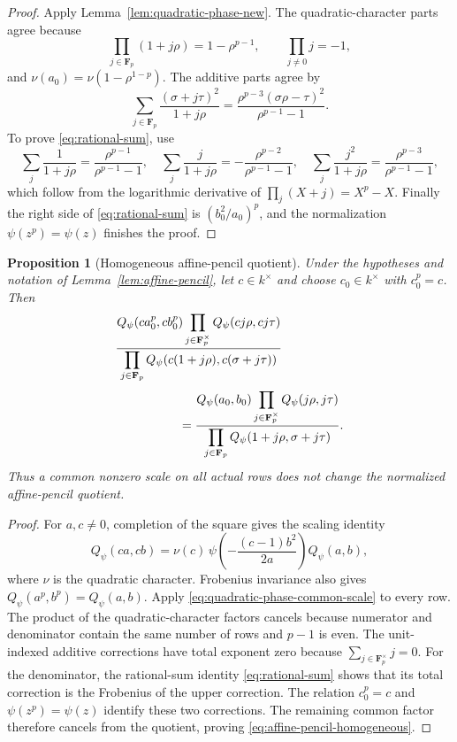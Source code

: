 \documentclass[11pt]{amsart}
\newtheorem{proposition}[theorem]{Proposition}
\theoremstyle{definition}
\theoremstyle{remark}
\newcommand{\F}{\mathbf F}
\begin{document}
\begin{proof}
Apply Lemma~\ref{lem:quadratic-phase-new}.  The quadratic-character
parts agree because
\[
 \prod_{j\in\F_p}(1+j\rho)=1-\rho^{p-1},
 \qquad
 \prod_{j\neq0}j=-1,
\]
and $\nu(a_0)=\nu(1-\rho^{1-p})$.  The additive parts agree by
\begin{equation}\label{eq:rational-sum}
 \sum_{j\in\F_p}\frac{(\sigma+j\tau)^2}{1+j\rho}
 =\frac{\rho^{p-3}(\sigma\rho-\tau)^2}{\rho^{p-1}-1}.
\end{equation}
To prove \eqref{eq:rational-sum}, use
\[
 \sum_j\frac1{1+j\rho}=\frac{\rho^{p-1}}{\rho^{p-1}-1},\quad
 \sum_j\frac{j}{1+j\rho}=-\frac{\rho^{p-2}}{\rho^{p-1}-1},\quad
 \sum_j\frac{j^2}{1+j\rho}=\frac{\rho^{p-3}}{\rho^{p-1}-1},
\]
which follow from the logarithmic derivative of
$\prod_j(X+j)=X^p-X$.  Finally the right side of
\eqref{eq:rational-sum} is $(b_0^2/a_0)^p$, and the normalization
$\psi(z^p)=\psi(z)$ finishes the proof.
\end{proof}


\begin{proposition}[Homogeneous affine-pencil quotient]
\label{prop:affine-pencil-homogeneous}
Under the hypotheses and notation of
Lemma~\ref{lem:affine-pencil}, let $c\in k^\times$ and choose
$c_0\in k^\times$ with $c_0^p=c$.  Then
\begin{align}
&\frac{
 Q_\psi(ca_0^p,cb_0^p)
 \displaystyle\prod_{j\in\F_p^\times}Q_\psi(cj\rho,cj\tau)}
 {\displaystyle\prod_{j\in\F_p}
 Q_\psi(c(1+j\rho),c(\sigma+j\tau))}
\notag\\[1mm]
&\hspace{18mm}=
\frac{
 Q_\psi(a_0,b_0)
 \displaystyle\prod_{j\in\F_p^\times}Q_\psi(j\rho,j\tau)}
 {\displaystyle\prod_{j\in\F_p}
 Q_\psi(1+j\rho,\sigma+j\tau)}.
\label{eq:affine-pencil-homogeneous}
\end{align}
Thus a common nonzero scale on all actual rows does not change the
normalized affine-pencil quotient.
\end{proposition}

\begin{proof}
For $a,c\ne0$, completion of the square gives the scaling identity
\begin{equation}\label{eq:quadratic-phase-common-scale}
 Q_\psi(ca,cb)
 =\nu(c)\,
  \psi\!\left(-\frac{(c-1)b^2}{2a}\right)Q_\psi(a,b),
\end{equation}
where $\nu$ is the quadratic character.  Frobenius invariance also gives
$Q_\psi(a^p,b^p)=Q_\psi(a,b)$.  Apply
\eqref{eq:quadratic-phase-common-scale} to every row.  The product of
the quadratic-character factors cancels because numerator and
denominator contain the same number of rows and $p-1$ is even.  The
unit-indexed additive corrections have total exponent zero because
$\sum_{j\in\F_p^\times}j=0$.  For the denominator, the rational-sum
identity \eqref{eq:rational-sum} shows that its total correction is the
Frobenius of the upper correction.  The relation $c_0^p=c$ and
$\psi(z^p)=\psi(z)$ identify these two corrections.  The remaining
common factor therefore cancels from the quotient, proving
\eqref{eq:affine-pencil-homogeneous}.
\end{proof}
\end{document}
